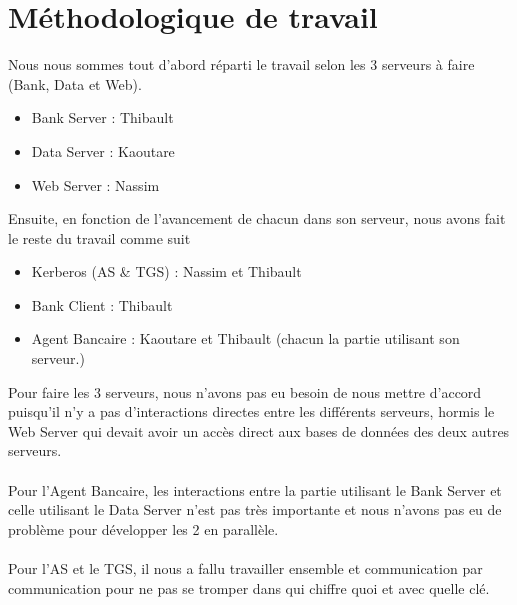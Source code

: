 \documentclass[11pt,fleqn]{article}
\begin{document}
\tableofcontents

\newpage


\section{Méthodologique de travail}
Nous nous sommes tout d'abord réparti le travail selon les 3 serveurs à faire (Bank, Data et Web).\\
\begin{itemize}
	\item Bank Server : Thibault
	\item Data Server : Kaoutare
	\item Web Server : Nassim
\end{itemize}
Ensuite, en fonction de l'avancement de chacun dans son serveur, nous avons fait le reste du travail comme suit
\begin{itemize}
	\item Kerberos (AS \& TGS) : Nassim et Thibault
	\item Bank Client : Thibault
	\item Agent Bancaire : Kaoutare et Thibault (chacun la partie utilisant son serveur.)
\end{itemize}
Pour faire les 3 serveurs, nous n'avons pas eu besoin de nous mettre d'accord puisqu'il n'y a pas d'interactions directes entre les différents serveurs, hormis le Web Server qui devait avoir un accès direct aux bases de données des deux autres serveurs.\\\\
Pour l'Agent Bancaire, les interactions entre la partie utilisant le Bank Server et celle utilisant le Data Server n'est pas très importante et nous n'avons pas eu de problème pour développer les 2 en parallèle.\\\\
Pour l'AS et le TGS, il nous a fallu travailler ensemble et communication par communication pour ne pas se tromper dans qui chiffre quoi et avec quelle clé.
\end{document}
